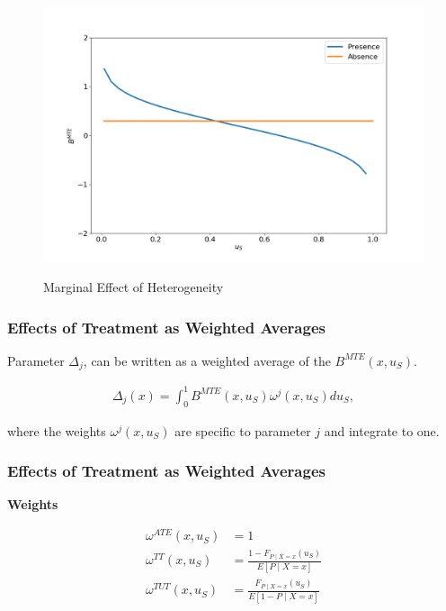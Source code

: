 \begin{frame}

\begin{figure}[htp]\centering
	\caption{Marginal Effect of Heterogeneity}\label{Marginal Effect of Heterogeneity}\scalebox{0.35}
	{\includegraphics{./material/fig-eh-marginal-effect.png}}
\end{figure}

\end{frame}


\begin{frame}
\frametitle{Effects of Treatment as Weighted Averages}

Parameter \(\Delta_j\), can be written as a weighted average of the
\(B^{MTE}(x, u_S)\).

\begin{align*}
\Delta_j(x) = \int_0^1 B^{MTE}(x, u_S) \omega^j(x, u_S) du_S,
\end{align*}

where the weights \(\omega^j(x, u_S)\) are specific to parameter \(j\)
and integrate to one.
\end{frame}

\begin{frame}
\frametitle{Effects of Treatment as Weighted Averages}
\textbf{Weights}

\begin{align*}
 \omega^{ATE}(x, u_S) & = 1 \\
 \omega^{TT}(x, u_S) & = \frac{1 - F_{P\mid X=x}(u_S)}{E[P \mid X = x]}\\
 \omega^{TUT}(x, u_S) & = \frac{F_{P\mid X=x}(u_S)}{E[1 - P \mid X = x]}
\end{align*}

\end{frame}


